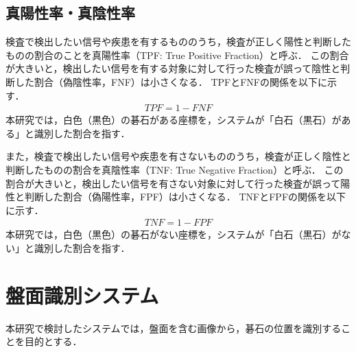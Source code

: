\documentclass[openright]{nitocs}
\numberwithin{equation}{section}
\begin{document}
        \subsection{真陽性率・真陰性率} %
        検査で検出したい信号や疾患を有するもののうち，検査が正しく陽性と判断したものの割合のことを真陽性率（TPF: True Positive Fraction）と呼ぶ．
        この割合が大きいと，検出したい信号を有する対象に対して行った検査が誤って陰性と判断した割合（偽陰性率，FNF）は小さくなる．
        TPFとFNFの関係を以下に示す．
        \begin{align}
            TPF = 1-FNF
        \end{align}
        本研究では，白色（黒色）の碁石がある座標を，システムが「白石（黒石）がある」と識別した割合を指す．

        また，検査で検出したい信号や疾患を有さないもののうち，検査が正しく陰性と判断したものの割合を真陰性率（TNF: True Negative Fraction）と呼ぶ．
        この割合が大きいと，検出したい信号を有さない対象に対して行った検査が誤って陽性と判断した割合（偽陽性率，FPF）は小さくなる．
        TNFとFPFの関係を以下に示す．
        \begin{align}
            TNF = 1-FPF
        \end{align}
        本研究では，白色（黒色）の碁石がない座標を，システムが「白石（黒石）がない」と識別した割合を指す．



    \section{盤面識別システム} %
    \label{system}
        本研究で検討したシステムでは，盤面を含む画像から，碁石の位置を識別することを目的とする．
\end{document}
